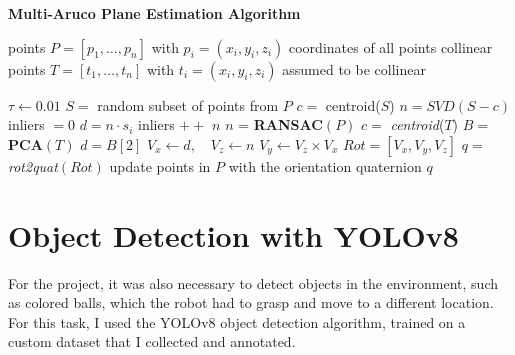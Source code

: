 \begin{algorithm}[H]
    \caption{\textbf{Multi-Aruco Plane Estimation Algorithm}}
    \label{alg:multi_aruco}
    \begin{algorithmic}[1]
    
    \Require points $P = \left[ p_1, \ldots, p_n \right]$ with $p_i = (x_i, y_i, z_i)$ coordinates of all points
    \Require collinear points $T = \left[t_1, \ldots, t_n \right]$ with $t_i = (x_i, y_i, z_i)$ assumed to be collinear
    
        \State $\tau \gets 0.01$ 
        \Repeat
            \State $S =$ random subset of points from $P$
            \State $c =$ centroid($S$) 
            \State $n = SVD(S - c)$  
            \State inliers $ = 0$ 
            \State $d = n \cdot s_i$ 
                 
                    \State inliers $++$
                \EndIf
            \EndFor
        \State \Return $n$ 
    \EndFunction
    \State
    \State $n$ = \textbf{RANSAC}$(P)$
    \State $c =$ \textit{centroid}($T$) 
    \State $B = $ \textbf{PCA}$(T)$ 
    \State $d = B[2]$ 
    \State $V_x \gets d, \quad V_z \gets n$
    \State $V_y \gets V_z \times V_x$ 
    \State $Rot = \left[V_x, V_y, V_z \right]$ 
    \State $q = $ \textit{rot2quat}$(Rot)$ 
    \State update points in $P$ with the orientation quaternion $q$
    \end{algorithmic}
\end{algorithm}

\section{Object Detection with YOLOv8}

For the project, it was also necessary to detect objects in the environment, such as colored balls, which the robot
had to grasp and move to a different location. For this task, I used the YOLOv8 object detection algorithm, trained
on a custom dataset that I collected and annotated.

